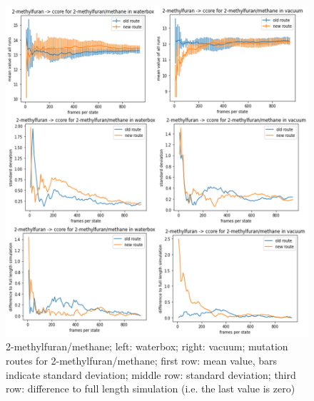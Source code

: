 \begin{figure}[!htb]
	
	\includegraphics[scale=0.9]{methylfuran_short}\caption{2-methylfuran/methane; left: waterbox; right: vacuum;  mutation routes for 2-methylfuran/methane; first row: mean value, bars indicate standard deviation; middle row: standard deviation; third row: difference to full length simulation (i.e. the last value is zero)}
	\label{fig:methylfuran_short}
\end{figure}


